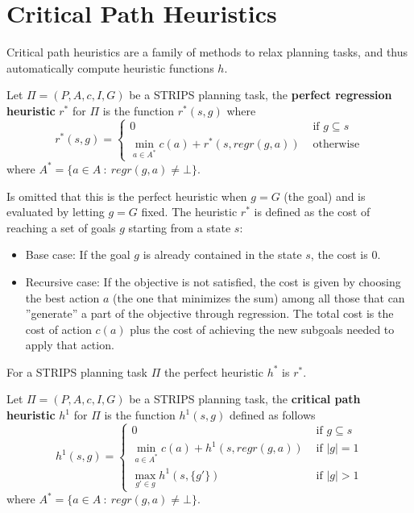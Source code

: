 \documentclass[10pt, letterpaper]{report}
\begin{document}
\section{Critical Path Heuristics}
Critical path heuristics are a family of methods to relax planning
 tasks, and thus automatically compute heuristic functions $h$.
 \begin{definition}
    Let $\Pi=(P,A,c,I,G)$ be a STRIPS planning task, the \textbf{perfect regression heuristic} $r^*$ for $\Pi$ is the function $r^*(s,g)$ where
    \begin{equation}
        r^*(s,g)=\begin{cases}
            0&\text{ if }g\subseteq s \\ 
            \displaystyle \min_{a\in A^*}c(a)+r^*(s,regr(g,a)) &\text{ otherwise}
        \end{cases}
    \end{equation}
    where $A^*=\{a\in A \ : \ regr(g,a)\ne \bot\}$.
 \end{definition}
 Is omitted that this is the perfect heuristic when $g=G$ (the goal) and is evaluated by letting $g=G$ fixed.
The heuristic $r^*$ is defined as the cost of reaching a set of goals $g$ starting from a state $s$: \begin{itemize}
    \item Base case: If the goal $g$ is already contained in the state $s$, the cost is 0.
    \item Recursive case: If the objective is not satisfied, the cost is given by choosing the best action $a$ (the one that minimizes the sum) among all those that can ''generate'' a part of the objective through regression. The total cost is the cost of action $c(a)$ plus the cost of achieving the new subgoals needed to apply that action.
\end{itemize}
\begin{proposition}
    For a STRIPS planning task $\Pi$ the perfect heuristic $h^*$ is $r^*$.
\end{proposition}
\begin{definition}\label{def:h1}
    Let $\Pi=(P,A,c,I,G)$ be a STRIPS planning task, the \textbf{critical path heuristic} $h^1$ for $\Pi$ is the function $h^1(s,g)$ defined as follows \begin{equation}
        h^1(s,g)=\begin{cases}
            0&\text{ if }g\subseteq s \\ 
            \displaystyle \min_{a\in A^*}c(a)+h^1(s,regr(g,a)) &\text{ if }|g|=1 \\
            \displaystyle \max_{g'\in g} h^1(s,\{g'\})&\text{ if }|g|>1
        \end{cases}
    \end{equation}
     where $A^*=\{a\in A \ : \ regr(g,a)\ne \bot\}$.
\end{definition}
\end{document}
